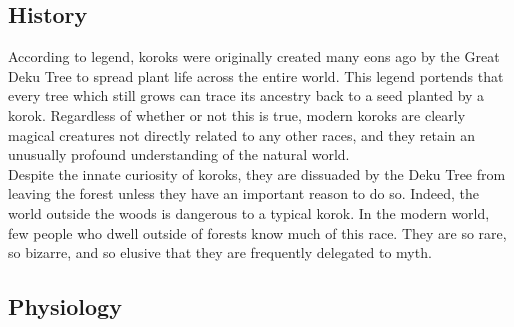 \documentclass[10pt,twoside,twocolumn,openany]{book}
\begin{document}
\subsection{History}

According to legend, koroks were originally created many eons ago by the Great Deku Tree to spread plant life across the entire world. This legend portends that every tree which still grows can trace its ancestry back to a seed planted by a korok. Regardless of whether or not this is true, modern koroks are clearly magical creatures not directly related to any other races, and they retain an unusually profound understanding of the natural world.\\
Despite the innate curiosity of koroks, they are dissuaded by the Deku Tree from leaving the forest unless they have an important reason to do so. Indeed, the world outside the woods is dangerous to a typical korok. In the modern world, few people who dwell outside of forests know much of this race. They are so rare, so bizarre, and so elusive that they are frequently delegated to myth.

\subsection{Physiology}
\end{document}
